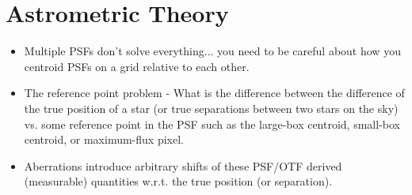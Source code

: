 \section{Astrometric Theory}

\begin{itemize}
\item Multiple PSFs don't solve everything... you need to be careful about how you centroid PSFs on a grid relative to each other. 
\item The reference point problem - What is the difference between the difference of the true position of a star (or true separations between two stars on the sky) vs. some reference point in the PSF such as the large-box centroid, small-box centroid, or maximum-flux pixel. 
\item Aberrations introduce arbitrary shifts of these PSF/OTF derived (measurable) quantities w.r.t. the true position (or separation).
\end{itemize}